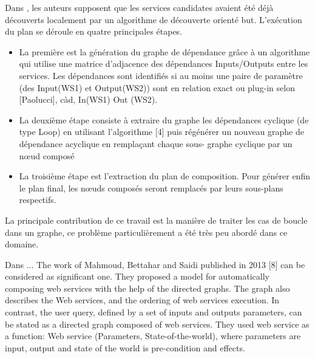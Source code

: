   \begin{text}
    Dans \cite{omer2009dependency}, les auteurs supposent que les
    services candidates avaient été déjà découverts localement par un
    algorithme de découverte orienté but. L'exécution du plan se déroule
    en quatre principales étapes.

    \SpecialItem
    \begin{itemize}
    \item La première est la génération du graphe de dépendance grâce à
      un algorithme qui utilise une matrice d'adjacence des dépendances
      Inputs/Outputs entre les services. Les dépendances sont identifiés
      si au moins une paire de paramètre (des Input(WS1) et Output(WS2))
      sont en relation exact ou plug-in selon [Paolucci], càd, In(WS1)
      Out (WS2).

    \item La deuxième étape consiste à extraire du graphe les
      dépendances cyclique (de type Loop) en utilisant l'algorithme [4]
      puis régénérer un nouveau graphe de dépendance acyclique en
      remplaçant chaque sous- graphe cyclique par un nœud composé

    \item La troisième étape est l'extraction du plan de
      composition. Pour générer enfin le plan final, les nœuds composés
      seront remplacés par leurs sous-plans respectifs.
    \end{itemize}

    La principale contribution de ce travail est la manière de traiter
    les cas de boucle dans un graphe, ce problème particulièrement a été
    très peu abordé dans ce domaine.
  \end{text}

  \begin{text}
    Dans \cite{mahmoud2013towards} ... %
    The work of Mahmoud, Bettahar and Saidi published in 2013 [8] can
    be considered as significant one. They proposed a model for
    automatically composing web services with the help of the directed
    graphs. The graph also describes the Web services, and the
    ordering of web services execution. In contrast, the user query,
    defined by a set of inputs and outputs parameters, can be stated
    as a directed graph composed of web services. They used web
    service as a function: Web service (Parameters,
    State-of-the-world), where parameters are input, output and state
    of the world is pre-condition and effects.
  \end{text}

